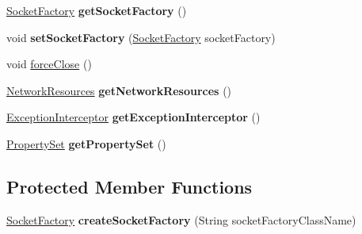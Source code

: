 \begin{DoxyCompactItemize}
\mbox{\hyperlink{interfacecom_1_1mysql_1_1cj_1_1protocol_1_1_socket_factory}{Socket\+Factory}} {\bfseries get\+Socket\+Factory} ()
\item 
\mbox{\label{classcom_1_1mysql_1_1cj_1_1protocol_1_1_abstract_socket_connection_a33c399d3a62154183561e8807bf4dcc5}} 
void {\bfseries set\+Socket\+Factory} (\mbox{\hyperlink{interfacecom_1_1mysql_1_1cj_1_1protocol_1_1_socket_factory}{Socket\+Factory}} socket\+Factory)
\item 
void \mbox{\hyperlink{classcom_1_1mysql_1_1cj_1_1protocol_1_1_abstract_socket_connection_a1c207a3f49d387dec92de48fc141de65}{force\+Close}} ()
\item 
\mbox{\label{classcom_1_1mysql_1_1cj_1_1protocol_1_1_abstract_socket_connection_a4352de9fb88c8ee51a26347fb3d680ec}} 
\mbox{\hyperlink{classcom_1_1mysql_1_1cj_1_1protocol_1_1_network_resources}{Network\+Resources}} {\bfseries get\+Network\+Resources} ()
\item 
\mbox{\label{classcom_1_1mysql_1_1cj_1_1protocol_1_1_abstract_socket_connection_aa8c3a29041cab7f202c842e456104a5b}} 
\mbox{\hyperlink{interfacecom_1_1mysql_1_1cj_1_1exceptions_1_1_exception_interceptor}{Exception\+Interceptor}} {\bfseries get\+Exception\+Interceptor} ()
\item 
\mbox{\label{classcom_1_1mysql_1_1cj_1_1protocol_1_1_abstract_socket_connection_a348b688bc6dc34862651adaf6b2f057f}} 
\mbox{\hyperlink{interfacecom_1_1mysql_1_1cj_1_1conf_1_1_property_set}{Property\+Set}} {\bfseries get\+Property\+Set} ()
\end{DoxyCompactItemize}
\subsection*{Protected Member Functions}
\begin{DoxyCompactItemize}
\item 
\mbox{\label{classcom_1_1mysql_1_1cj_1_1protocol_1_1_abstract_socket_connection_adeac7abffbd9deac0a2ab724e803ed91}} 
\mbox{\hyperlink{interfacecom_1_1mysql_1_1cj_1_1protocol_1_1_socket_factory}{Socket\+Factory}} {\bfseries create\+Socket\+Factory} (String socket\+Factory\+Class\+Name)
\end{DoxyCompactItemize}
